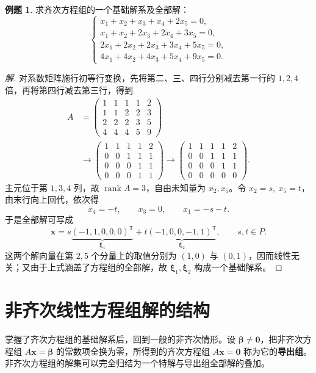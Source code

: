 \documentclass[UTF8, fontset=fandol, a4paper, 12pt]{ctexart}
\newcommand{\rank}{\operatorname{rank}}
\newcommand{\vx}{\boldsymbol{x}}
\newcommand{\vb}{\boldsymbol{\beta}}
\newcommand{\vo}{\boldsymbol{0}}
\newcommand{\vxi}{\boldsymbol{\xi}}
\theoremstyle{definition}
\newtheorem{example}[definition]{例题}
\begin{document}
\begin{example}\label{ex:class-hom}
求齐次方程组的一个基础解系及全部解：
\[
 \begin{cases}
 x_1+x_2+x_3+x_4+2x_5=0,\\
 x_1+x_2+2x_3+2x_4+3x_5=0,\\
 2x_1+2x_2+2x_3+3x_4+5x_5=0,\\
 4x_1+4x_2+4x_3+5x_4+9x_5=0.
 \end{cases}
\]
\end{example}
\begin{proof}[解]
对系数矩阵施行初等行变换，先将第二、三、四行分别减去第一行的 $1,2,4$ 倍，再将第四行减去第三行，得到
\begin{align*}
 A&=\begin{pmatrix}1&1&1&1&2\\1&1&2&2&3\\2&2&2&3&5\\4&4&4&5&9\end{pmatrix}\\
 &\longrightarrow
 \begin{pmatrix}1&1&1&1&2\\0&0&1&1&1\\0&0&0&1&1\\0&0&0&1&1\end{pmatrix}
 \longrightarrow
 \begin{pmatrix}1&1&1&1&2\\0&0&1&1&1\\0&0&0&1&1\\0&0&0&0&0\end{pmatrix}.
\end{align*}
主元位于第 $1,3,4$ 列，故 $\rank A=3$，自由未知量为 $x_2,x_5$。令 $x_2=s,\ x_5=t$，由末行向上回代，依次得
\[
 x_4=-t,\qquad x_3=0,\qquad x_1=-s-t.
\]
于是全部解可写成
\[
 \vx=s\underbrace{(-1,1,0,0,0)^{\mathsf T}}_{\vxi_1}
       +t\underbrace{(-1,0,0,-1,1)^{\mathsf T}}_{\vxi_2},\qquad s,t\in P.
\]
这两个解向量在第 $2,5$ 个分量上的取值分别为 $(1,0)$ 与 $(0,1)$，因而线性无关；又由于上式涵盖了方程组的全部解，故 $\vxi_1,\vxi_2$ 构成一个基础解系。
\end{proof}

\section{非齐次线性方程组解的结构}

掌握了齐次方程组的基础解系后，回到一般的非齐次情形。设 $\vb\ne\vo$，把非齐次方程组 $A\vx=\vb$ 的常数项全换为零，所得到的齐次方程组 $A\vx=\vo$ 称为它的\textbf{导出组}。非齐次方程组的解集可以完全归结为一个特解与导出组全部解的叠加。
\end{document}

